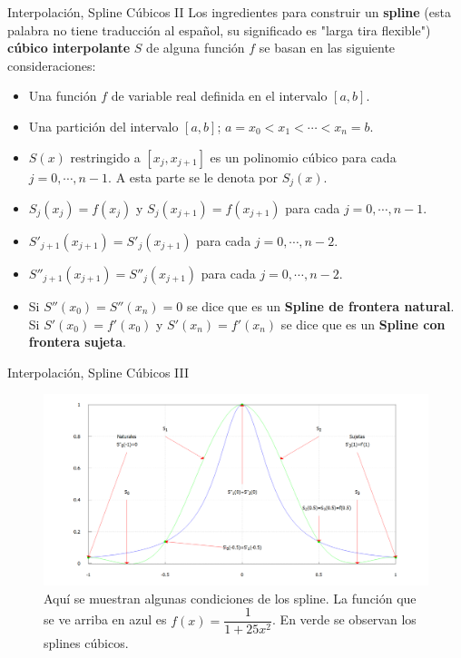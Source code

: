 \begin{frame}{Interpolación, Spline Cúbicos II}
\indent Los ingredientes para construir un \textbf{spline} (esta palabra no tiene traducción al español, su significado es "larga tira flexible") \textbf{cúbico interpolante} $S$ de alguna función $f$ se basan en las siguiente consideraciones:
\begin{itemize}
\item Una función $f$ de variable real definida en el intervalo $[a,b]$.
\item Una partición del intervalo $[a,b]$; $a=x_0<x_1<\cdots<x_n=b$.
\item $S(x)$ restringido a $[x_j,x_{j+1}]$ es un polinomio cúbico para cada $j=0,\cdots, n-1$. A esta parte se le denota por $S_j(x)$.
\item $S_j(x_j)=f(x_j)$ y $S_{j}(x_{j+1})=f(x_{j+1})$ para cada $j=0,\cdots, n-1$.
\item $S'_{j+1}(x_{j+1})=S'_{j}(x_{j+1})$ para cada $j=0,\cdots, n-2$.
\item $S''_{j+1}(x_{j+1})=S''_{j}(x_{j+1})$ para cada $j=0,\cdots, n-2$.
\item Si $S''(x_0)=S''(x_n)=0$ se dice que es un \textbf{Spline de frontera natural}. Si $S'(x_0)=f'(x_0)$ y $S'(x_n)=f'(x_n)$ se dice que es un \textbf{Spline con frontera sujeta}. 
\end{itemize}
\end{frame}
\begin{frame}{Interpolación, Spline Cúbicos III}
\begin{figure}
\begin{center}
\includegraphics[scale=0.4]{Imagen22}
\end{center}
\caption{Aquí se muestran algunas condiciones de los spline. La función que se ve arriba en azul es $f(x)=\dfrac{1}{1+25x^2}$. En verde se observan los splines cúbicos.}
\end{figure}
\end{frame}
